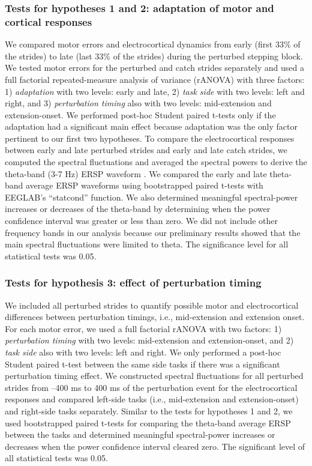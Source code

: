 \documentclass[shortpaper,twoside,web]{ieeecolor}
\begin{document}
\subsubsection{Tests for hypotheses 1 and 2: adaptation of motor and cortical responses}
We compared motor errors and electrocortical dynamics from early (first 33\% of the strides) to late (last 33\% of the strides) during the perturbed stepping block. We tested motor errors for the perturbed and catch strides separately and used a full factorial repeated-measure analysis of variance (rANOVA) with three factors: 1) \textit{adaptation} with two levels: early and late, 2) \textit{task side} with two levels: left and right, and 3) \textit{perturbation timing} also with two levels: mid-extension and extension-onset. We performed post-hoc Student paired t-tests only if the adaptation had a significant main effect because adaptation was the only factor pertinent to our first two hypotheses. To compare the electrocortical responses between early and late perturbed strides and early and late catch strides, we computed the spectral fluctuations and averaged the spectral powers to derive the theta-band (3-7 Hz) ERSP waveform \cite{Pfurtscheller1999-oi,Wagner2016-nx}. We compared the early and late theta-band average ERSP waveforms using bootstrapped paired t-tests with EEGLAB’s “statcond” function. We also determined meaningful spectral-power increases or decreases of the theta-band by determining when the power confidence interval was greater or less than zero. We did not include other frequency bands in our analysis because our preliminary results showed that the main spectral fluctuations were limited to theta. The significance level for all statistical tests was 0.05.

\subsubsection{Tests for hypothesis 3: effect of perturbation timing}
We included all perturbed strides to quantify possible motor and electrocortical differences between perturbation timings, i.e., mid-extension and extension onset. For each motor error, we used a full factorial rANOVA with two factors: 1) \textit{perturbation timing} with two levels: mid-extension and extension-onset, and 2) \textit{task side} also with two levels: left and right. We only performed a post-hoc Student paired t-test between the same side tasks if there was a significant perturbation timing effect. We constructed spectral fluctuations for all perturbed strides from –400 ms to 400 ms of the perturbation event for the electrocortical responses and compared left-side tasks (i.e., mid-extension and extension-onset) and right-side tasks separately. Similar to the tests for hypotheses 1 and 2, we used bootstrapped paired t-tests for comparing the theta-band average ERSP between the tasks and determined meaningful spectral-power increases or decreases when the power confidence interval cleared zero. The significant level of all statistical tests was 0.05.
\end{document}
